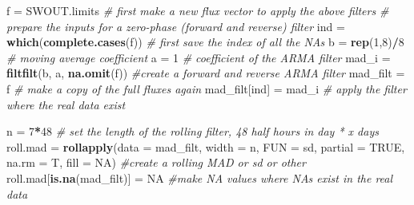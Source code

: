\documentclass[
]{article}
\newenvironment{Shaded}{\begin{snugshade}}{\end{snugshade}}
\newcommand{\AttributeTok}[1]{\textcolor[rgb]{0.13,0.29,0.53}{#1}}
\newcommand{\CommentTok}[1]{\textcolor[rgb]{0.56,0.35,0.01}{\textit{#1}}}
\newcommand{\ConstantTok}[1]{\textcolor[rgb]{0.56,0.35,0.01}{#1}}
\newcommand{\DecValTok}[1]{\textcolor[rgb]{0.00,0.00,0.81}{#1}}
\newcommand{\FunctionTok}[1]{\textcolor[rgb]{0.13,0.29,0.53}{\textbf{#1}}}
\newcommand{\NormalTok}[1]{#1}
\newcommand{\OtherTok}[1]{\textcolor[rgb]{0.56,0.35,0.01}{#1}}
\newcommand{\SpecialCharTok}[1]{\textcolor[rgb]{0.81,0.36,0.00}{\textbf{#1}}}
\begin{document}
\begin{Shaded}
\begin{Highlighting}[]
\NormalTok{f }\OtherTok{=}\NormalTok{ SWOUT.limits }\CommentTok{\# first make a new flux vector to apply the above filters}
\CommentTok{\# prepare the inputs for a zero{-}phase (forward and reverse) filter  }
\NormalTok{ind       }\OtherTok{=} \FunctionTok{which}\NormalTok{(}\FunctionTok{complete.cases}\NormalTok{(f))   }\CommentTok{\# first save the index of all the NAs}
\NormalTok{b         }\OtherTok{=} \FunctionTok{rep}\NormalTok{(}\DecValTok{1}\NormalTok{,}\DecValTok{8}\NormalTok{)}\SpecialCharTok{/}\DecValTok{8}                 \CommentTok{\# moving average coefficient}
\NormalTok{a         }\OtherTok{=} \DecValTok{1}                          \CommentTok{\# coefficient of the ARMA filter}
\NormalTok{mad\_i    }\OtherTok{=} \FunctionTok{filtfilt}\NormalTok{(b, a, }\FunctionTok{na.omit}\NormalTok{(f)) }\CommentTok{\#create a forward and reverse ARMA filter}
\NormalTok{mad\_filt }\OtherTok{=}\NormalTok{ f                          }\CommentTok{\# make a copy of the full fluxes again}
\NormalTok{mad\_filt[ind] }\OtherTok{=}\NormalTok{ mad\_i                }\CommentTok{\# apply the filter where the real data exist}

\NormalTok{n }\OtherTok{=} \DecValTok{7}\SpecialCharTok{*}\DecValTok{48} \CommentTok{\# set the length of the rolling filter, 48 half hours in day * x days}
\NormalTok{roll.mad }\OtherTok{=} \FunctionTok{rollapply}\NormalTok{(}\AttributeTok{data =}\NormalTok{ mad\_filt,}
                     \AttributeTok{width =}\NormalTok{ n,}
                     \AttributeTok{FUN =}\NormalTok{ sd,}
                     \AttributeTok{partial =} \ConstantTok{TRUE}\NormalTok{,}
                     \AttributeTok{na.rm =}\NormalTok{ T,}
                     \AttributeTok{fill =} \ConstantTok{NA}\NormalTok{)  }\CommentTok{\#create a rolling MAD or sd or other}
\NormalTok{roll.mad[}\FunctionTok{is.na}\NormalTok{(mad\_filt)] }\OtherTok{=} \ConstantTok{NA}  \CommentTok{\#make NA values where NAs exist in the real data}



\end{Highlighting}
\end{Shaded}
\end{document}
